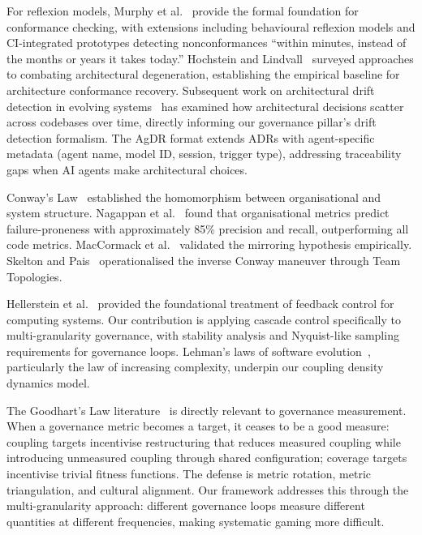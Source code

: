 \documentclass[11pt, a4paper, logo, copyright]{googledeepmind}
\begin{document}
For reflexion models, Murphy et al.~\citep{murphy1995, murphy2001} provide the formal foundation for conformance checking, with extensions including behavioural reflexion models and CI-integrated prototypes detecting nonconformances ``within minutes, instead of the months or years it takes today.'' Hochstein and Lindvall~\citep{hochstein2005} surveyed approaches to combating architectural degeneration, establishing the empirical baseline for architecture conformance recovery. Subsequent work on architectural drift detection in evolving systems~\citep{passos2021} has examined how architectural decisions scatter across codebases over time, directly informing our governance pillar's drift detection formalism. The AgDR format extends ADRs with agent-specific metadata (agent name, model ID, session, trigger type), addressing traceability gaps when AI agents make architectural choices.

Conway's Law~\citep{conway1968} established the homomorphism between organisational and system structure. Nagappan et al.~\citep{nagappan2008} found that organisational metrics predict failure-proneness with approximately 85\% precision and recall, outperforming all code metrics. MacCormack et al.~\citep{maccormack2008} validated the mirroring hypothesis empirically. Skelton and Pais~\citep{skelton2019} operationalised the inverse Conway maneuver through Team Topologies.

Hellerstein et al.~\citep{hellerstein2004} provided the foundational treatment of feedback control for computing systems. Our contribution is applying cascade control specifically to multi-granularity governance, with stability analysis and Nyquist-like sampling requirements for governance loops. Lehman's laws of software evolution~\citep{Lehman1980}, particularly the law of increasing complexity, underpin our coupling density dynamics model.

The Goodhart's Law literature~\citep{goodhart1975, manheim2019goodhart} is directly relevant to governance measurement. When a governance metric becomes a target, it ceases to be a good measure: coupling targets incentivise restructuring that reduces measured coupling while introducing unmeasured coupling through shared configuration; coverage targets incentivise trivial fitness functions. The defense is metric rotation, metric triangulation, and cultural alignment. Our framework addresses this through the multi-granularity approach: different governance loops measure different quantities at different frequencies, making systematic gaming more difficult.
\end{document}

